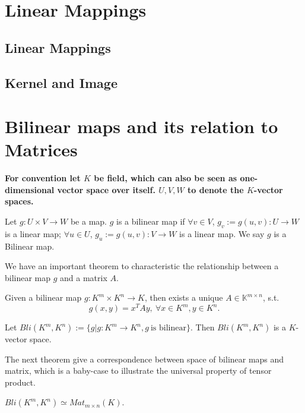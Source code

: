 \documentclass[11pt]{article}
\begin{document}
\section{Linear Mappings}
\label{sec:org750899a}
\subsection{Linear Mappings}
\label{sec:org100706a}

\subsection{Kernel and Image}
\label{sec:orgbb763c4}
\section{Bilinear maps and its relation to Matrices}
\label{sec:org2260f16}
\textbf{For convention let \(K\) be field, which can also be seen as one-dimensional vector space over itself. \(U, V, W\) to denote the \(K\)-vector spaces.}


\begin{definition}
Let \(g:U\times V \to W\) be a map. \(g\) is a bilinear map if \(\forall v\in V\), \(g_v:= g(u,v): U\to W\) is a linear map; \(\forall u\in U\), \(g_u:= g(u,v): V\to W\) is a linear map. We say \(g\) is a Bilinear map.
\end{definition}

We have an important theorem to characteristic the relationship between a bilinear map \(g\) and a matrix \(A\).

\begin{theorem}
Given a bilinear map \(g: K^m \times K^n \to K\), then exists a unique \(A\in \mathbb{K}^{m\times n}\), s.t.
\[
g(x,y) = x^T A y, \ \forall x \in K^m, y \in K^n.
\]
\end{theorem}

\begin{proposition}[ ]
Let \(Bli(K^m, K^n):= \{g\vert g:K^m \to K^n, g \ \text{is bilinear}\}\). Then \(Bli(K^m, K^n)\) is a \(K\)-vector space.
\end{proposition}

The next theorem give a correspondence between space of bilinear maps and matrix, which is a baby-case to illustrate the universal property of tensor product.

\begin{theorem}
\(Bli(K^m, K^n) \simeq Mat_{m\times n}(K)\).
\end{theorem}
\end{document}
